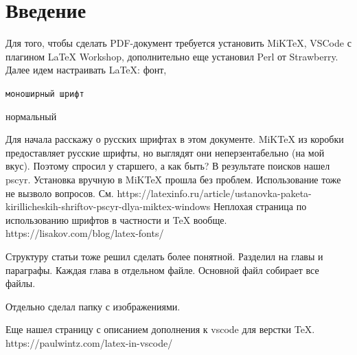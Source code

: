 \section{Введение}

Для того, чтобы сделать PDF-документ требуется установить MiKTeX, VSCode с плагином LaTeX Workshop, дополнительно еще установил Perl от Strawberry.  
Далее идем настраивать LaTeX: фонт,  

\texttt{моноширный шрифт}

нормальный

Для начала расскажу о русских шрифтах в этом документе.
MiKTeX из коробки предоставляет русские шрифты, но выглядят они неперзентабельно (на мой вкус).
Поэтому спросил у старшего, а как быть? В результате поисков нашел pscyr.
Установка вручную в MiKTeX прошла без проблем. Использование тоже не вызволо вопросов. См. https://latexinfo.ru/article/ustanovka-paketa-kirillicheskih-shriftov-pscyr-dlya-miktex-windows
Неплохая страница по использованию шрифтов в частности и TeX вообще. https://lisakov.com/blog/latex-fonts/

Структуру статьи тоже решил сделать более понятной. Разделил на главы и параграфы. Каждая глава в отдельном файле. Основной файл собирает все файлы.

Отдельно сделал папку с изображениями.

Еще нашел страницу с описанием дополнения к vscode для верстки TeX. https://paulwintz.com/latex-in-vscode/

